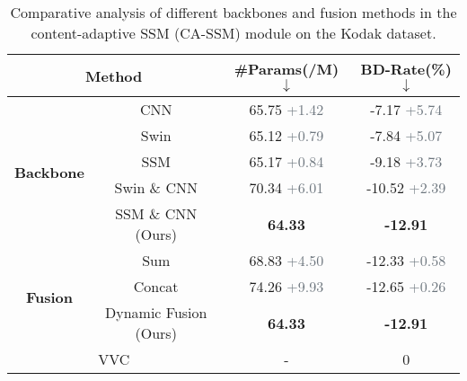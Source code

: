 \begin{table}[t]
\centering
\setlength{\tabcolsep}{3pt}
\caption{
Comparative analysis of different backbones and fusion methods in the content-adaptive SSM (CA-SSM) module on the Kodak dataset.
}
\renewcommand{\arraystretch}{1.05}
\begin{tabular}{cc|cc}
\toprule
\multicolumn{2}{c|}{\textbf{Method}} & \textbf{\#Params(/M)} $\downarrow$ & \textbf{BD-Rate(\%)} $\downarrow$ \\ \midrule \midrule
\multicolumn{1}{c|}{\multirow{5}{*}{\textbf{Backbone}}}   & CNN &  65.75 \scriptsize{\textcolor[HTML]{6c757d}{+1.42}}& -7.17 \scriptsize{\textcolor[HTML]{6c757d}{+5.74}} \\
\multicolumn{1}{c|}{}                          & Swin &  65.12 \scriptsize{\textcolor[HTML]{6c757d}{+0.79}}& -7.84 \scriptsize{\textcolor[HTML]{6c757d}{+5.07}} \\ 
\multicolumn{1}{c|}{}                          & SSM &  65.17 \scriptsize{\textcolor[HTML]{6c757d}{+0.84}}& -9.18 \scriptsize{\textcolor[HTML]{6c757d}{+3.73}} \\ 
\multicolumn{1}{c|}{} & Swin \& CNN &  70.34 \scriptsize{\textcolor[HTML]{6c757d}{+6.01}} &  -10.52 \scriptsize{\textcolor[HTML]{6c757d}{+2.39}}  \\
\multicolumn{1}{c|}{}                          & SSM \& CNN (Ours) & \textbf{64.33} &  \textbf{-12.91} \\ \midrule
\multicolumn{1}{c|}{\multirow{3}{*}{\textbf{Fusion}}} & Sum &     68.83 \scriptsize{\textcolor[HTML]{6c757d}{+4.50}} &  -12.33 \scriptsize{\textcolor[HTML]{6c757d}{+0.58}}  \\
\multicolumn{1}{c|}{}                               & Concat &    74.26 \scriptsize{\textcolor[HTML]{6c757d}{+9.93}} &  -12.65 \scriptsize{\textcolor[HTML]{6c757d}{+0.26}}  \\ 
\multicolumn{1}{c|}{}                               & Dynamic Fusion (Ours) &  \textbf{64.33} &  \textbf{-12.91} \\ \midrule
\multicolumn{2}{c|}{VVC} &           -    &    0        \\ \bottomrule
\end{tabular}
\label{tab3}
\end{table}
